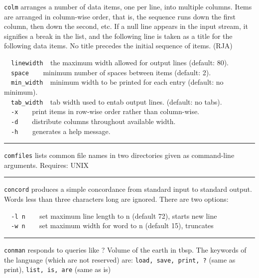 {\texttt{colm} arranges a number of data items, one per line, into
multiple columns. Items are arranged in column-wise order, that is, the
sequence runs down the first column, then down the second, etc. If a
null line appears in the input stream, it signifies a break in the
list, and the following line is taken as a title for the following data
items. No title precedes the initial sequence of items. (RJA)

\texttt{\ \ linewidth\ \ }the maximum width allowed for output lines
(default: 80).\\
\ \ \texttt{space\ \ \ \ }minimum number of spaces between items
(default: 2).\\
\ \ \texttt{min\_width\ \ }minimum width to be printed for each entry
(default: no minimum).\\
\ \ \texttt{tab\_width}\texttt{\ \ }tab width used to entab output
lines. (default: no tabs).\\
\ \ \texttt{{}-x}\ \ \ \ print items in row-wise order rather than
column-wise.\\
\ \ \texttt{{}-d}\ \ \ \ distribute columns throughout available
width.\\
\ \ \texttt{{}-h}\texttt{\ \ \ \ }generates a help message.

\vspace{0.25cm}\hrule{}

\texttt{comfiles} lists common file names in two directories given as
command-line arguments. Requires: UNIX 

\vspace{0.25cm}\hrule{}

\texttt{concord} produces a simple concordance from standard input to
standard output. Words less than three characters long are ignored.
There are two options:

\texttt{\ \ }\texttt{{}-l n}\texttt{\ \ }\ \ set maximum line length to
n (default 72), starts new line\\
\ \ \texttt{{}-w n}\texttt{\ \ }\ \ set maximum width for word to n
(default 15), truncates

\vspace{0.25cm}\hrule{}

\texttt{conman} responds to queries like {\textquotedbl}? Volume of the
earth in tbsp{\textquotedbl}. The keywords of the language (which are
not reserved) are: \texttt{load, save, print, ?} (same as print),
\texttt{list, is, are} (same as is)

}
